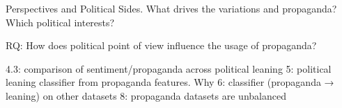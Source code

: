 \label{chap:political_sides}
Perspectives and Political Sides. What drives  the variations and propaganda? Which political interests? 

RQ:
How does political point of view influence the usage of propaganda?


4.3: comparison of sentiment/propaganda across political leaning
5: political leaning classifier from propaganda features. Why
6: classifier (propaganda → leaning) on other datasets
8: propaganda datasets are unbalanced